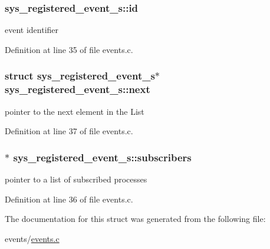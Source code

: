 \subsubsection[{id}]{ sys\+\_\+registered\+\_\+event\+\_\+s\+::id}\label{structsys__registered__event__s_a44886c67a44aee553cbbbcd9903fcd39}
event identifier 

Definition at line 35 of file events.\+c.

\hypertarget{structsys__registered__event__s_a084bfc795b0f5135b6439a28bf9920c1}{}
\subsubsection[{next}]{\setlength{\rightskip}{0pt plus 5cm}struct {\bf sys\+\_\+registered\+\_\+event\+\_\+s}$\ast$ sys\+\_\+registered\+\_\+event\+\_\+s\+::next}\label{structsys__registered__event__s_a084bfc795b0f5135b6439a28bf9920c1}
pointer to the next element in the List 

Definition at line 37 of file events.\+c.

\hypertarget{structsys__registered__event__s_acea93fade98b2e5bd81cc9b6ed35388d}{}
\subsubsection[{subscribers}]{$\ast$ sys\+\_\+registered\+\_\+event\+\_\+s\+::subscribers}\label{structsys__registered__event__s_acea93fade98b2e5bd81cc9b6ed35388d}
pointer to a list of subscribed processes 

Definition at line 36 of file events.\+c.



The documentation for this struct was generated from the following file\+:\begin{DoxyCompactItemize}
\item 
events/\hyperlink{events_8c}{events.\+c}\end{DoxyCompactItemize}
